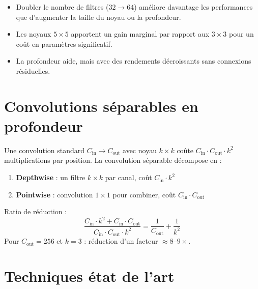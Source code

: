\begin{remarque}
\begin{itemize}
  \item Doubler le nombre de filtres ($32 \to 64$) am\'eliore davantage les
    performances que d'augmenter la taille du noyau ou la profondeur.
  \item Les noyaux $5 \times 5$ apportent un gain marginal par rapport aux
    $3 \times 3$ pour un co\^ut en param\`etres significatif.
  \item La profondeur aide, mais avec des rendements d\'ecroissants sans
    connexions r\'esiduelles.
\end{itemize}
\end{remarque}

\section{Convolutions s\'eparables en profondeur}
\label{sec:depthwise-separable}

\begin{formules}[title=\textbf{Convolution s\'eparable en profondeur}]
Une convolution standard $C_{\text{in}} \to C_{\text{out}}$ avec noyau $k \times k$
co\^ute $C_{\text{in}} \cdot C_{\text{out}} \cdot k^2$ multiplications par position.
La convolution s\'eparable d\'ecompose en :
\begin{enumerate}
  \item \textbf{Depthwise} : un filtre $k \times k$ par canal, co\^ut $C_{\text{in}} \cdot k^2$
  \item \textbf{Pointwise} : convolution $1 \times 1$ pour combiner, co\^ut $C_{\text{in}} \cdot C_{\text{out}}$
\end{enumerate}
Ratio de r\'eduction :
\begin{equation}
\frac{C_{\text{in}} \cdot k^2 + C_{\text{in}} \cdot C_{\text{out}}}{C_{\text{in}} \cdot C_{\text{out}} \cdot k^2}
= \frac{1}{C_{\text{out}}} + \frac{1}{k^2}
\end{equation}
Pour $C_{\text{out}} = 256$ et $k = 3$ : r\'eduction d'un facteur $\approx 8\text{--}9\times$.
\end{formules}

\section{Techniques \'etat de l'art}
\label{sec:cnn-sota}

